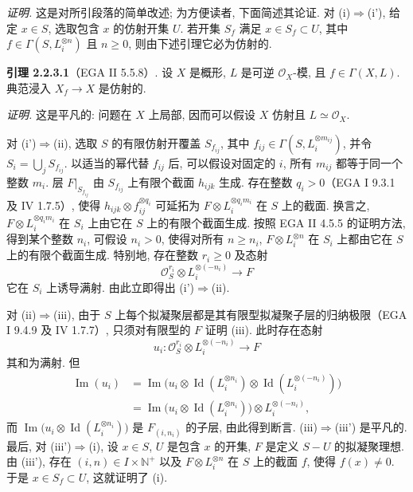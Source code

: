 \emph{证明.} 这是对所引段落的简单改述; 为方便读者, 下面简述其论证. 对 (i)$\Rightarrow$(i'), 给定 $x\in S$, 选取包含 $x$ 的仿射开集 $U$. 若开集 $S_f$ 满足 $x\in S_f\subset U$, 其中 $f\in\Gamma(S,L_i^{\otimes n})$ 且 $n\ge0$, 则由下述引理它必为仿射的.

\textbf{引理 2.2.3.1}（EGA II 5.5.8）. 设 $X$ 是概形, $L$ 是可逆 $\mathcal O_X$-模, 且 $f\in\Gamma(X,L)$. 典范浸入 $X_f\to X$ 是仿射的.

\emph{证明.} 这是平凡的: 问题在 $X$ 上局部, 因而可以假设 $X$ 仿射且 $L\simeq\mathcal O_X$.

对 (i')$\Rightarrow$(ii), 选取 $S$ 的有限仿射开覆盖 $S_{f_{ij}}$, 其中 $f_{ij}\in\Gamma(S,L_i^{\otimes m_{ij}})$, 并令 $S_i=\bigcup_j S_{f_{ij}}$. 以适当的幂代替 $f_{ij}$ 后, 可以假设对固定的 $i$, 所有 $m_{ij}$ 都等于同一个整数 $m_i$. 层 $F|_{S_{f_{ij}}}$ 由 $S_{f_{ij}}$ 上有限个截面 $h_{ijk}$ 生成. 存在整数 $q_i>0$（EGA I 9.3.1 及 IV 1.7.5）, 使得 $h_{ijk}\otimes f_{ij}^{\otimes q_i}$ 可延拓为 $F\otimes L_i^{\otimes q_im_i}$ 在 $S$ 上的截面. 换言之, $F\otimes L_i^{\otimes q_im_i}$ 在 $S_i$ 上由它在 $S$ 上的有限个截面生成. 按照 EGA II 4.5.5 的证明方法, 得到某个整数 $n_i$, 可假设 $n_i>0$, 使得对所有 $n\ge n_i$, $F\otimes L_i^{\otimes n}$ 在 $S_i$ 上都由它在 $S$ 上的有限个截面生成. 特别地, 存在整数 $r_i\ge0$ 及态射
\[
\mathcal O_S^{r_i}\otimes L_i^{\otimes(-n_i)}\longrightarrow F
\]
它在 $S_i$ 上诱导满射. 由此立即得出 (i')$\Rightarrow$(ii).

对 (ii)$\Rightarrow$(iii), 由于 $S$ 上每个拟凝聚层都是其有限型拟凝聚子层的归纳极限（EGA I 9.4.9 及 IV 1.7.7）, 只须对有限型的 $F$ 证明 (iii). 此时存在态射
\[
u_i:\mathcal O_S^{r_i}\otimes L_i^{\otimes(-n_i)}\longrightarrow F
\]
其和为满射. 但
\[
\begin{aligned}\operatorname{Im}(u_i)&=\operatorname{Im}\bigl(u_i\otimes\operatorname{Id}(L_i^{\otimes n_i})\otimes\operatorname{Id}(L_i^{\otimes(-n_i)})\bigr)\\&=\operatorname{Im}\bigl(u_i\otimes\operatorname{Id}(L_i^{\otimes n_i})\bigr)\otimes L_i^{\otimes(-n_i)},\end{aligned}
\]
而 $\operatorname{Im}\bigl(u_i\otimes\operatorname{Id}(L_i^{\otimes n_i})\bigr)$ 是 $F_{(i,n_i)}$ 的子层, 由此得到断言. (iii)$\Rightarrow$(iii') 是平凡的. 最后, 对 (iii')$\Rightarrow$(i), 设 $x\in S$, $U$ 是包含 $x$ 的开集, $F$ 是定义 $S-U$ 的拟凝聚理想. 由 (iii'), 存在 $(i,n)\in I\times\mathbb N^{+}$ 以及 $F\otimes L_i^{\otimes n}$ 在 $S$ 上的截面 $f$, 使得 $f(x)\ne0$. 于是 $x\in S_f\subset U$, 这就证明了 (i).

